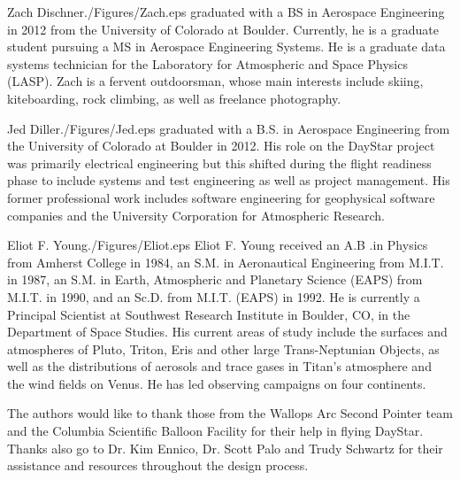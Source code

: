 \documentclass[twocolumn,letterpaper]{IEEEAerospace2012}
\newcommand{\rootdir}{./Figures/}
\begin{document}
\begin{biographywithpic}{Zach Dischner}{\rootdir Zach.eps}
graduated with a BS in Aerospace Engineering in 2012 from the University of Colorado at Boulder. Currently, he is a graduate student pursuing a MS in Aerospace Engineering Systems. He is a graduate data systems technician for the Laboratory for Atmospheric and Space Physics (LASP). Zach is a fervent outdoorsman, whose main interests include skiing, kiteboarding, rock climbing, as well as freelance photography.
\end{biographywithpic}

\begin{biographywithpic}{Jed Diller}{\rootdir Jed.eps}
graduated with a B.S. in Aerospace Engineering from the University of Colorado at Boulder in 2012. His role on the DayStar project was primarily electrical engineering but this shifted during the flight readiness phase to include systems and test engineering as well as project management. His former professional work includes software engineering for geophysical software companies and the University Corporation for Atmospheric Research.
\end{biographywithpic}

\begin{biographywithpic}{Eliot F. Young}{\rootdir Eliot.eps}
Eliot F. Young received an A.B .in Physics from Amherst College in 1984, an S.M. in Aeronautical Engineering from M.I.T. in 1987, an S.M. in Earth, Atmospheric and Planetary Science (EAPS) from M.I.T. in 1990, and an Sc.D. from M.I.T. (EAPS) in 1992. He is currently a Principal Scientist at Southwest Research Institute in Boulder, CO, in the Department of Space Studies. His current areas of study include the surfaces and atmospheres of Pluto, Triton, Eris and other large Trans-Neptunian Objects, as well as the distributions of aerosols and trace gases in Titan's atmosphere and the wind fields on Venus. He has led observing campaigns on four continents.
\end{biographywithpic}

\acknowledgments
The authors would like to thank those from the Wallops Arc Second Pointer team and the Columbia Scientific Balloon Facility for their help in flying DayStar. Thanks also go to Dr. Kim Ennico, Dr. Scott Palo and Trudy Schwartz for their assistance and resources throughout the design process.
\end{document}
